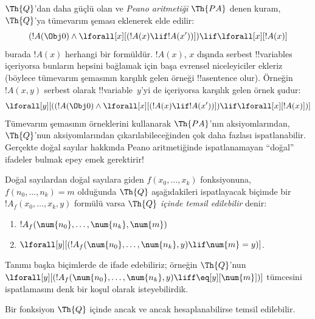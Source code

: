 \documentclass[../../../include/open-logic-section]{subfiles}
\begin{document}
$\Th{Q}$'dan daha güçlü olan ve \emph{Peano aritmetiği} $\Th{PA}$ denen
kuram, $\Th{Q}$'ya tümevarım şeması eklenerek elde edilir:
\[
(!A(\Obj 0) \land \lforall[x][(!A(x) \lif !A(x'))]) \lif \lforall[x][!A(x)]
\]
burada $!A(x)$ herhangi bir formüldür. $!A(x)$, $x$ dışında serbest
!!{variable}s içeriyorsa bunların hepsini bağlamak için başa evrensel
niceleyiciler ekleriz (böylece tümevarım şemasının karşılık gelen örneği
!!a{sentence} olur). Örneğin $!A(x,y)$ serbest olarak !!{variable}~$y$'yi
de içeriyorsa karşılık gelen örnek şudur:
\[
\lforall[y][((!A(\Obj 0) \land \lforall[x][(!A(x) \lif !A(x'))]) \lif
  \lforall[x][!A(x)])]
\]
Tümevarım şemasının örneklerini kullanarak $\Th{PA}$'nın aksiyomlarından,
$\Th{Q}$'nun aksiyomlarından çıkarılabileceğinden çok daha fazlası
ispatlanabilir. Gerçekte doğal sayılar hakkında Peano aritmetiğinde
ispatlanamayan ``doğal'' ifadeler bulmak epey emek gerektirir!{}

\begin{defn}
  Doğal sayılardan doğal sayılara giden $f(x_0,\ldots,x_k)$ fonksiyonuna,
  $f(n_0,\dots,n_k)=m$ olduğunda $\Th{Q}$ aşağıdakileri ispatlayacak
  biçimde bir $!A_f(x_0,\dots,x_k,y)$ formülü varsa
  {\em $\Th{Q}$ içinde temsil edilebilir} denir:
\begin{enumerate}
\item{} $!A_f(\num{n_0}, \dots, \num{n_k}, \num{m})$
\item{} $\lforall[y][(!A_f(\num{n_0}, \dots,
\num{n_k}, y) \lif \num{m} = y)]$.
\end{enumerate}
\end{defn}

Tanımı başka biçimlerde de ifade edebiliriz; örneğin $\Th{Q}$'nun
$\lforall[y][(!A_f(\num{n_0}, \dots, \num{n_k}, y) \liff
\eq[y][\num{m}])]$ tümcesini ispatlamasını denk bir koşul olarak
isteyebilirdik.

\begin{thm}
Bir fonksiyon $\Th{Q}$ içinde ancak ve ancak hesaplanabilirse temsil
edilebilir.
\end{thm}
\end{document}

